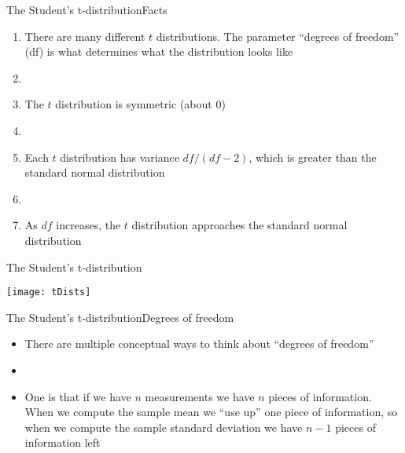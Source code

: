\documentclass[xcolor=dvipsnames]{beamer}
\begin{document}
\begin{frame}{The Student's t-distribution}{Facts}
\begin{enumerate}
	\item There are many different $t$ distributions. The parameter ``degrees of freedom'' (df) is what determines what the distribution looks like  \pause
	\item[]
	\item The $t$ distribution is symmetric (about 0)  \pause
	\item[]
	\item Each $t$ distribution has variance $df / (df - 2)$, which is greater than the standard normal distribution  \pause
	\item[]
	\item As $df$ increases, the $t$ distribution approaches the standard normal distribution 
\end{enumerate}	
\end{frame}

\begin{frame}{The Student's t-distribution}
	\begin{center}
		\texttt{[image: tDists]}
	\end{center}
\end{frame}

\begin{frame}{The Student's t-distribution}{Degrees of freedom}
	\begin{itemize}
		\item There are multiple conceptual ways to think about ``degrees of freedom''  \pause
		\item[]
		\item One is that if we have $n$ measurements we have $n$ pieces of information. When we compute the sample mean we ``use up'' one piece of information, so when we compute the sample standard deviation we have $n-1$ pieces of information left
	\end{itemize}
\end{frame}
\end{document}
